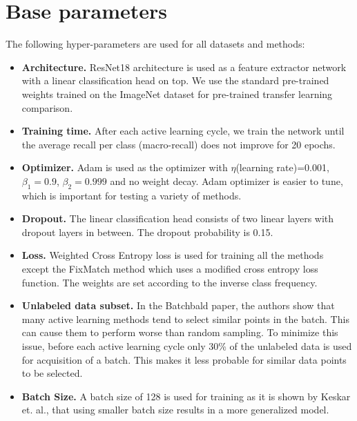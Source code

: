 \section{Base parameters}\label{section:base_parameters}
The following hyper-parameters are used for all datasets and methods:
\begin{itemize}
  \item \textbf{Architecture.} ResNet18\cite{he2016} architecture is used as a feature extractor network with a linear classification head on top. We use the standard pre-trained weights trained on the ImageNet\cite{deng2009} dataset for pre-trained transfer learning comparison.
  \item \textbf{Training time.} After each active learning cycle, we train the network until the average recall per class (macro-recall) does not improve for 20 epochs.
  \item \textbf{Optimizer.} Adam\cite{kingma2014} is used as the optimizer with $\eta$(learning rate)=0.001, $\beta_1=0.9$, $\beta_2=0.999$ and no weight decay. Adam optimizer is easier to tune\cite{schneider2019}, which is important for testing a variety of methods.
  \item \textbf{Dropout.} The linear classification head consists of two linear layers with dropout layers in between. The dropout probability is 0.15.
  \item \textbf{Loss.} Weighted Cross Entropy loss is used for training all the methods except the FixMatch method which uses a modified cross entropy loss function. The weights are set according to the inverse class frequency.
  \item \textbf{Unlabeled data subset.} In the Batchbald\cite{kirsch2019} paper, the authors show that many active learning methods tend to select similar points in the batch. This can cause them to perform worse than random sampling. To minimize this issue, before each active learning cycle only 30\% of the unlabeled data is used for acquisition of a batch. This makes it less probable for similar data points to be selected.
  \item \textbf{Batch Size.} A batch size of 128 is used for training as it is shown by Keskar et. al.\cite{keskar2016}, that using smaller batch size results in a more generalized model.
\end{itemize}
